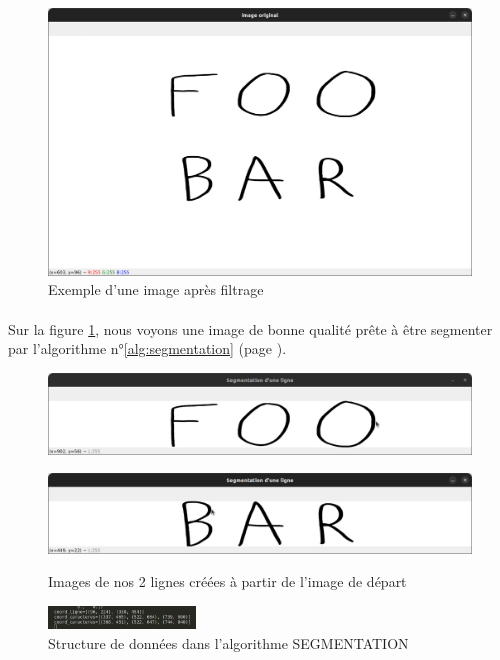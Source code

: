 \documentclass[a4paper]{article}
\begin{document}
			\begin{figure}
				\includegraphics[width=.75\textwidth]{segmentation_image_originel.png}
				\caption{Exemple d'une image après filtrage}
				\centering
				\label{fig:imageOriginel}
			\end{figure}
			\paragraph{} Sur la figure \ref{fig:imageOriginel}, nous voyons une image de bonne qualité prête à être segmenter par l'algorithme n°\ref{alg:segmentation} (page \pageref{alg:segmentation}). 
			\begin{figure}
				\includegraphics[width=.8\textwidth]{segmentation_ligne1.png}
				\caption{Images de nos 2 lignes créées à partir de l'image de départ}
				\centering
				\includegraphics[width=.8\textwidth]{segmentation_ligne2.png}
				\centering
				\label{fig:imageLignes}
			\end{figure}
			\begin{figure}
				\includegraphics[width=0.35\textwidth]{structDonnee.png}
				\caption{Structure de données dans l'algorithme SEGMENTATION}
					\label{fig:structDonnee}
			\end{figure}
\end{document}
